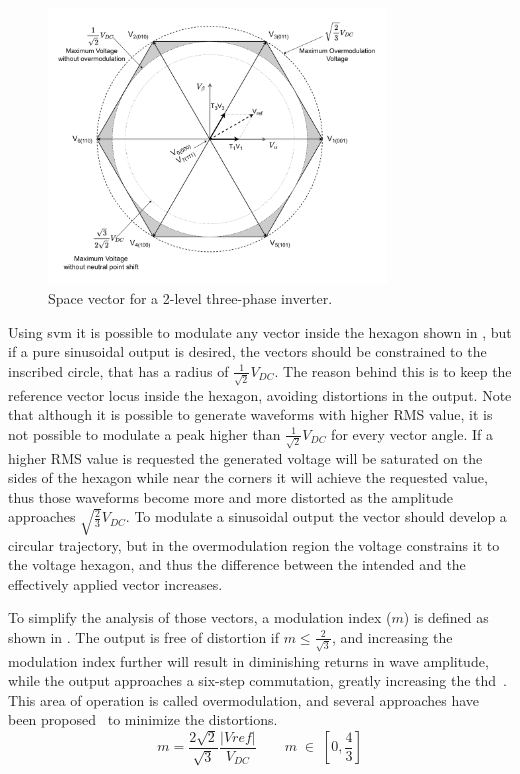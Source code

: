 \begin{figure}[!htb]
	\centering
	\includegraphics[width=0.8\textwidth]{Figures/Space_Vector_revised.pdf}
	\caption[Space vector for a 2-level three-phase inverter.]{Space vector for a 2-level three-phase inverter.}
	\label{fig:space_vector}%
\end{figure}


Using \gls{svm} it is possible to modulate any vector inside the hexagon shown in , but if a pure sinusoidal output is desired, the vectors should be constrained to the inscribed circle, that has a radius of $\frac{1}{\sqrt{2}} V_{DC}$. The reason behind this is to keep the reference vector locus inside the hexagon, avoiding distortions in the output. Note that although it is possible to generate waveforms with higher RMS value, it is not possible to modulate a peak higher than $\frac{1}{\sqrt{2}} V_{DC}$ for every vector angle. If a higher RMS value is requested the generated voltage will be saturated on the sides of the hexagon while near the corners it will achieve the requested value, thus those waveforms become more and more distorted as the amplitude approaches $\sqrt{\frac{2}{3}} V_{DC}$. To modulate a sinusoidal output the vector should develop a circular trajectory, but in the overmodulation region the voltage constrains it to the voltage hexagon, and thus the difference between the intended and the effectively applied vector increases.

To simplify the analysis of those vectors, a modulation index ($m$) is defined as shown in . The output is free of distortion if $m\le\frac{2}{\sqrt{3}}$, and increasing the modulation index further will result in diminishing returns in wave amplitude, while the output approaches a six-step commutation, greatly increasing the \gls{thd}~\cite{Microchip:Overmodulation:2023}. This area of operation is called overmodulation, and several approaches have been proposed~\cite{Briz:overmodulation_technique_field_weakening:2001,MehriziSani:advanced_modulation_techniques:2007} to minimize the distortions.
\begin{equation}
	m = \frac{2\sqrt{2}}{\sqrt{3}}\frac{\left|V{ref}\right|}{V_{DC}} \quad \quad m \;\in\; \left[0, \frac{4}{3}\right]
	\label{eq:modulation_index}
\end{equation}

